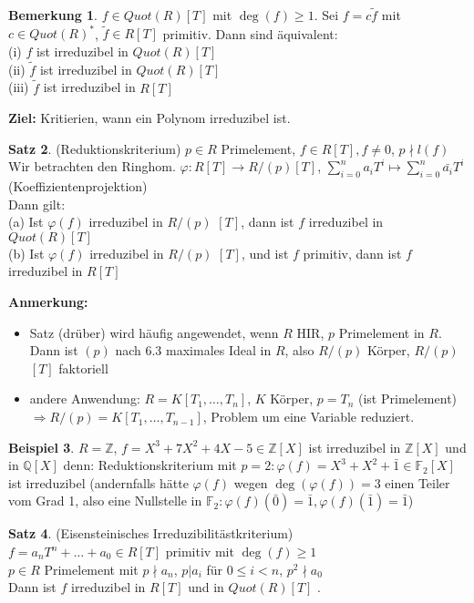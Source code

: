 \documentclass[10pt,a4paper,numbers=endperiod]{scrreprt}
\theoremstyle{definition}
\newtheorem{satz}{Satz}[section]
\newtheorem{bem}[satz]{Bemerkung}
\newtheorem{bsp}[satz]{Beispiel}
\def\QQ{{\mathbb Q}}
\def\ZZ{{\mathbb Z}}
\def\FF{{\mathbb F}}
\begin{document}
\begin{bem}
	$f \in Quot(R)[T]$ mit $\deg(f) \geq 1$. Sei $f = c \tilde{f}$ mit $c \in Quot(R)^*$, $\tilde{f} \in R[T]$ primitiv. Dann sind äquivalent:\\
	(i) $f$ ist irreduzibel in $Quot(R)[T]$\\
	(ii) $\tilde{f}$ ist irreduzibel in $Quot(R)[T]$\\
	(iii) $\tilde{f}$ ist irreduzibel in $R[T]$
\end{bem}

\textbf{Ziel:} Kritierien, wann ein Polynom irreduzibel ist.

\begin{satz}
	(Reduktionskriterium) $p \in R$ Primelement, $f \in R[T], f \neq 0$, $p \nmid l(f)$\\
	Wir betrachten den Ringhom. $\varphi: R[T] \rightarrow R/(p) [T]$, $\sum\limits_{i = 0}^{n} a_iT^i \mapsto \sum\limits_{i = 0}^n \bar{a_i} T^i$ (Koeffizientenprojektion)\\
	Dann gilt:\\
	(a) Ist $\varphi(f)$ irreduzibel in $R/(p)$ $[T]$, dann ist $f$ irreduzibel in $Quot(R)[T]$\\
	(b) Ist $\varphi(f)$ irreduzibel in $R/(p)$ $[T]$, und ist $f$ primitiv, dann ist $f$ irreduzibel in $R[T]$ 
\end{satz}

\textbf{Anmerkung:} \begin{itemize}
	\item Satz (drüber) wird häufig angewendet, wenn $R$ HIR, $p$ Primelement in $R$. Dann ist $(p)$ nach 6.3 maximales Ideal in $R$, also $R/(p)$ Körper, $R/(p)$ $[T]$ faktoriell
	\item andere Anwendung: $R = K[T_1, \ldots, T_n]$, $K$ Körper, $p = T_n$ (ist Primelement) $\Rightarrow R/(p) = K[T_1, \ldots, T_{n-1}]$, Problem um eine Variable reduziert.
\end{itemize}

\begin{bsp}
	$R = \ZZ$, $f = X^3 + 7X^2 + 4X -5 \in \ZZ[X]$ ist irreduzibel in $\ZZ[X]$ und in $\QQ[X]$ denn: Reduktionskriterium mit $p = 2: \varphi(f) = X^3+ X^2 + \bar{1} \in \FF_2[X]$ ist irreduzibel (andernfalls hätte $\varphi(f)$ wegen $\deg(\varphi(f)) = 3$ einen Teiler vom Grad 1, also eine Nullstelle in $\FF_2: \varphi(f) (\bar{0}) = \bar{1}, \varphi(f)(\bar{1}) = \bar{1}$) 
\end{bsp}

\begin{satz}
	(Eisensteinisches Irreduzibilitästkriterium)\\
	$f = a_nT^n + \ldots + a_0 \in R[T]$ primitiv mit $\deg(f) \geq 1$\\
	$p \in R$ Primelement mit $p \nmid a_n$, $p | a_i$ für $0 \leq i < n$, $p^2 \nmid a_0$\\
	Dann ist $f$ irreduzibel in $R[T]$ und in $Quot(R)[T]$ .
\end{satz}
\end{document}
